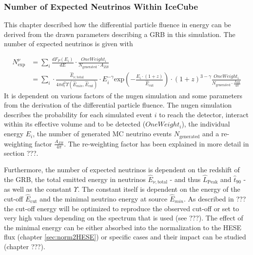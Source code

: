 \subsubsection{Number of Expected Neutrinos Within IceCube}
\label{subsubsec:NExp}
This chapter described how the differential particle fluence in energy can be
derived from the drawn parameters describing a GRB in this simulation. The
number of expected neutrinos is  given with


\begin{equation}
\begin{align}
 N_\text{exp}^\nu & = \sum_i\frac{dF_P(E_i)}{dE} \cdot
\frac{OneWeight_i}{N_\text{generated} \cdot A_{ZB}} \\
&= \sum_i \cdot \frac{\hat{E}_{\nu, \text{total}}}{4 \pi
d_l^2\Upsilon\left(\hat{E}_{min}, \hat{E}_\text{cut}\right)} \cdot
E_i^{-\gamma}
\text{exp} \left( - \frac{E_i \cdot (1+z)}{\hat{E}_\text{cut}} \right) \cdot
(1+z)^{3 - \gamma}
\frac{OneWeight_i}{N_\text{generated} \cdot \frac{A_{ZB}}{4 \pi}}
\end{align}
\end{equation}
It is dependent on various factors of the nugen simulation and some parameters
from the derivation of the differential particle fluence. The nugen simulation
describes the probability for each simulated event $i$ to reach the detector,
interact within its effective volume and to be detected ($OneWeight_i$), the
individual energy $E_i$, the number of generated MC neutrino events
$N_\text{generated}$ and a re-weighting factor $\frac{A_{ZB}}{4 \pi}$. The
re-weighting factor has been explained in more detail in section ???. 

Furthermore, the number of expected neutrinos is dependent on the redshift of
the GRB, the total emitted energy in neutrinos $\hat{E}_{\nu, \text{total}}$ -
and thus $\hat{L}_\text{Peak}$ and $\hat{t}_{90}$ - as well as the constant
$\Upsilon$. The constant itself is dependent on the energy of the cut-off
$\hat{E}_\text{cut}$ and the minimal neutrino energy at source $\hat{E}_{min}$.
As described in ??? the cut-off energy will be optimized to reproduce the
observed cut-off or set to very high values depending on the spectrum that is
used (see ???). The effect of the minimal energy can be either absorbed into
the normalization to the HESE flux (chapter \ref{sec:norm2HESE}) or specific
cases and their impact can be studied (chapter ???).